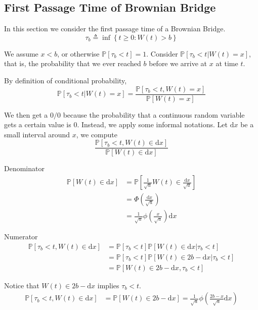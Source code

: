     \subsection{First Passage Time of Brownian Bridge}
        In this section we consider the first passage time of a Brownian Bridge.
        \[ \tau_b \triangleq \inf\left\{ t \ge 0 : W(t) > b \right\} \]

        We assume $x < b$, or otherwise $\mathbb{P}[\tau_b < t] = 1$. Consider $\mathbb{P}[\tau_b < t | W(t) = x]$, that is, the probability that we ever reached $b$ before we arrive at $x$ at time $t$.

        By definition of conditional probability,
        \[ \mathbb{P}[\tau_b < t | W(t) =  x] = \frac{\mathbb{P}[\tau_b < t, W(t) = x]}{\mathbb{P}[W(t) = x]} \]

        We then get a $0/0$ because the probability that a continuous random variable gets a certain value is 0. Instead, we apply some informal notations. Let $\mathrm{d}x$ be a small interval around $x$, we compute
        \[ \frac{\mathbb{P}[\tau_b < t, W(t) \in \mathrm{d}x]}{\mathbb{P}[W(t) \in \mathrm{d}x]} \]

        Denominator
        \begin{align*}
            \mathbb{P}[W(t) \in \mathrm{d}x] &= \mathbb{P}[\frac{1}{\sqrt{u}}W(t) \in \frac{\mathrm{d}x}{\sqrt{u}}]\\
            &= \Phi(\frac{\mathrm{d}x}{\sqrt{u}})\\
            &= \frac{1}{\sqrt{u}}\phi(\frac{x}{\sqrt{u}})\mathrm{d}x
        \end{align*}

        Numerator
        \begin{align*}
            \mathbb{P}[\tau_b < t, W(t) \in \mathrm{d}x] &= \mathbb{P}[\tau_b < t] \mathbb{P}[W(t) \in \mathrm{d}x | \tau_b < t]\\
            &= \mathbb{P}[\tau_b < t]\mathbb{P}[W(t) \in 2b - \mathrm{d}x | \tau_b < t]\\
            &= \mathbb{P}[W(t) \in 2b-\mathrm{d}x, \tau_b < t]
        \end{align*}

        Notice that $W(t) \in 2b-\mathrm{d}x$ implies $\tau_b < t$.
        \begin{align*}
            \mathbb{P}[\tau_b < t, W(t) \in \mathrm{d}x] &= \mathbb{P}[W(t) \in 2b-\mathrm{d}x] = \frac{1}{\sqrt{u}}\phi\left( \frac{2b-x}{\sqrt{u}}\mathrm{d}x \right)
        \end{align*}

